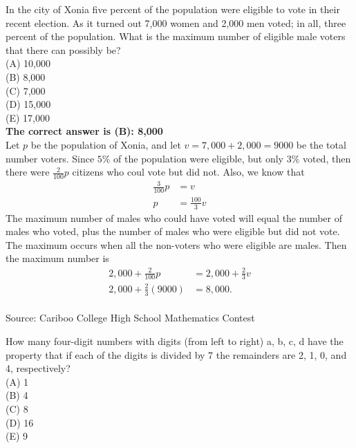 \documentclass{article}
\begin{document}
\normalsize
In the city of Xonia five percent of the population were eligible to vote in their recent election. As it turned out 7,000 women and 2,000 men voted; in all, three percent of the population. What is the maximum number of eligible male voters that there can possibly be?\\
(A) 10,000\\
(B) 8,000\\
(C) 7,000\\
(D) 15,000\\
(E) 17,000\\


\textbf{The correct answer is (B): 8,000}\\[1 ex]
Let $p$ be the population of Xonia, and let $v=7,000+2,000=9000$ be the total number voters. Since $5\%$ of the population were eligible, but only $3\%$ voted, then there were $\frac{2}{100}p$ citizens who coul vote but did not. Also, we know that
\begin{align*}
\frac{3}{100}p&=v\\
p&=\frac{100}{3}v
\end{align*}
The maximum number of males who could have voted will equal the number of males who voted, plus the number of males who were eligible but did not vote. The maximum occurs when all the non-voters who were eligible are males. Then the maximum number is
\begin{align*}
2,000+\frac{2}{100}p &=2,000+\frac{2}{3}v\\
2,000+\frac{2}{3}(9000)&=8,000.
\end{align*}
\\[5 ex]

\scriptsize
Source: Cariboo College High School Mathematics Contest

\normalsize
How many four-digit numbers with digits (from left to right) a, b, c, d have the property that if each of the digits is divided by 7 the remainders are 2, 1, 0, and 4, respectively?\\
(A) 1\\
(B) 4\\
(C) 8\\
(D) 16\\
(E) 9\\
\end{document}

